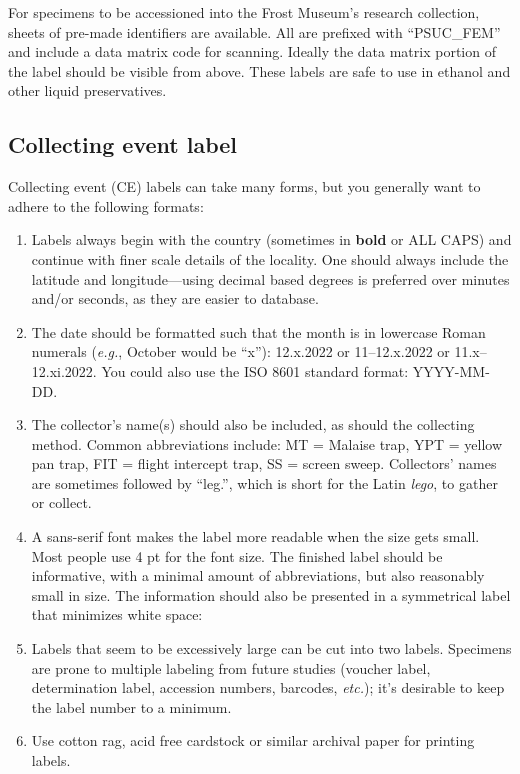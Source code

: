 \noindent{}For specimens to be accessioned into the Frost Museum's research collection, sheets of pre-made identifiers are available. All are prefixed with ``PSUC\_FEM'' and include a data matrix code for scanning. Ideally the data matrix portion of the label should be visible from above. These labels are safe to use in ethanol and other liquid preservatives.

\subsection{Collecting event label}
Collecting event (CE) labels can take many forms, but you generally want to adhere to the following formats:

\begin{enumerate}
\item Labels always begin with the country (sometimes in \textbf{bold} or ALL CAPS) and continue with finer scale details of the locality. One should always include the latitude and longitude---using decimal based degrees is preferred over minutes and/or seconds, as they are easier to database.
\item The date should be formatted such that the month is in lowercase Roman numerals (\textit{e.g.}, October would be ``x''): 12.x.2022 or 11--12.x.2022 or 11.x--12.xi.2022. You could also use the ISO 8601 standard format: YYYY-MM-DD.
\item The collector's name(s) should also be included, as should the collecting method. Common abbreviations include: MT = Malaise trap, YPT = yellow pan trap, FIT = flight intercept trap, SS = screen sweep. Collectors' names are sometimes followed by ``leg.'', which is short for the Latin \textit{lego}, to gather or collect.
\item A sans-serif font makes the label more readable when the size gets small. Most people use 4 pt for the font size. The finished label should be informative, with a minimal amount of abbreviations, but also reasonably small in size. The information should also be presented in a symmetrical label that minimizes white space:\\

\begin{labelfontsmall}
\tiny 
{}
\end{labelfontsmall}
\normalsize

\item Labels that seem to be excessively large can be cut into two labels. Specimens are prone to multiple labeling from future studies (voucher label, determination label, accession numbers, barcodes, \textit{etc.}); it's desirable to keep the label number to a minimum.
\item Use cotton rag, acid free cardstock or similar archival paper for printing labels.
\end{enumerate}

